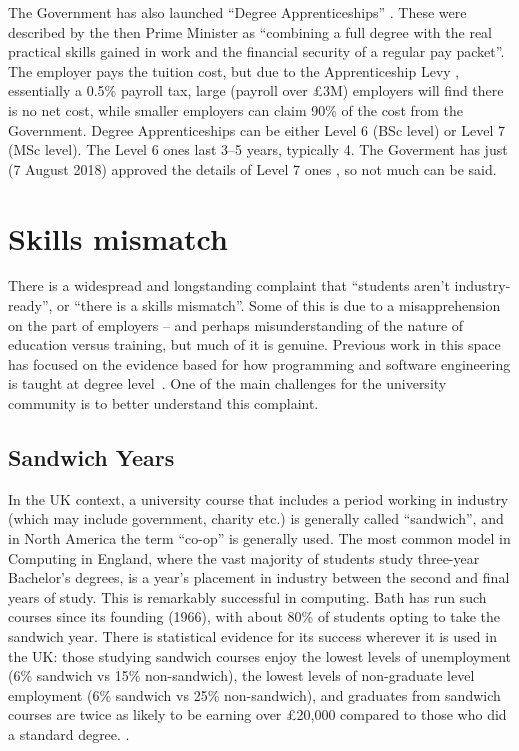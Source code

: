 \documentclass[sigconf]{acmart}
\begin{document}
The Government has also launched ``Degree Apprenticeships''
\cite{BIS2015a}. These were described by the then Prime Minister as
``combining a full degree with the real practical skills gained in
work and the financial security of a regular pay packet''. The
employer pays the tuition cost, but due to the Apprenticeship Levy%
, essentially a 0.5\% payroll tax, large (payroll over \pounds3M) employers will find there is no net cost, while smaller employers can claim 90\% of the cost from the Government.  
Degree Apprenticeships can be either Level 6 (BSc level) or Level 7 (MSc level). The Level 6 ones last 3--5 years, typically 4. 
The Goverment has just (7 August 2018) approved the details of Level 7 ones%
, so not much can be said.

\section{Skills mismatch}\label{sec:Skills}

There is a widespread and longstanding complaint that ``students
aren't industry-ready'', or ``there is a skills mismatch''. Some of
this is due to a misapprehension on the part of employers -- and
perhaps misunderstanding of the nature of education versus training,
but much of it is genuine. Previous work in this space has
focused on the evidence based for how programming and software
engineering is taught at degree
level~\cite{davenport-et-al:latice2016,murphy-et-al:programming2017,simon-et-al:sigcse2018}. One
of the main challenges for the university community is to better
understand this complaint.

\subsection{Sandwich Years}

In the UK context, a university course that includes a period working
in industry (which may include government, charity etc.) is generally
called ``sandwich'', and in North America the term ``co-op'' is
generally used. The most common model in Computing in England, where
the vast majority of students study three-year Bachelor's degrees, is
a year's placement in industry between the second and final years of
study. This is remarkably successful in computing.  %
Bath has run such courses since its founding (1966), with about 80\%
of students opting to take the sandwich year.  There is statistical
evidence for its success wherever it is used in the UK: those studying
sandwich courses enjoy the lowest levels of unemployment (6\% sandwich
vs 15\% non-sandwich), the lowest levels of non-graduate level
employment (6\% sandwich vs 25\% non-sandwich), and graduates from
sandwich courses are twice as likely to be earning over \pounds20,000
compared to those who did a standard
degree. \cite[\P2.5]{Shadbolt2016a}.
\end{document}

